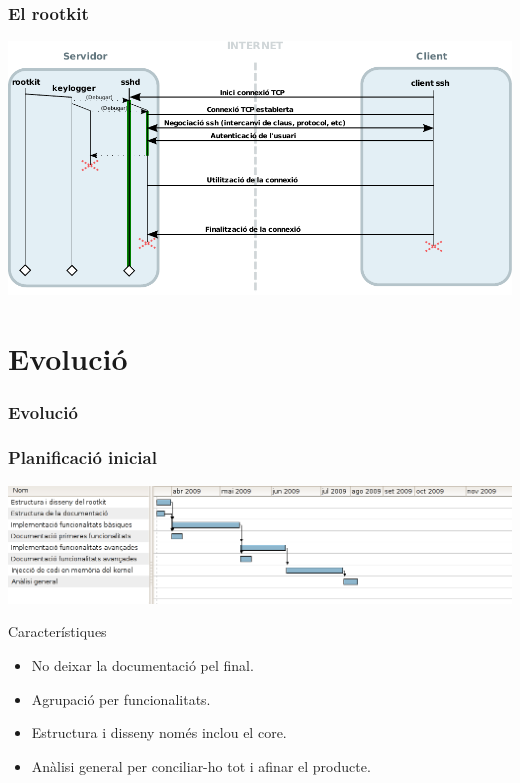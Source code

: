 \documentclass{beamer}
\begin{document}
\begin{frame}
	\frametitle{El rootkit}
	\includegraphics[scale=0.65,keepaspectratio]{sshd_keylogger.pdf}
\end{frame}

\section{Evolució}
\begin{frame}
	\frametitle{Evolució}
\end{frame}

\begin{frame}
	\frametitle{Planificació inicial}
	\hspace*{-0.38in}
	\includegraphics[scale=0.35,keepaspectratio]{gantt1.png} 
	\begin{block}{Característiques}
		\begin{itemize}
			\item No deixar la documentació pel final.
			\item Agrupació per funcionalitats.
			\item Estructura i disseny només inclou el core.
			\item Anàlisi general per conciliar-ho tot i afinar el producte.
		\end{itemize}
	\end{block}
\end{frame}
\end{document}

